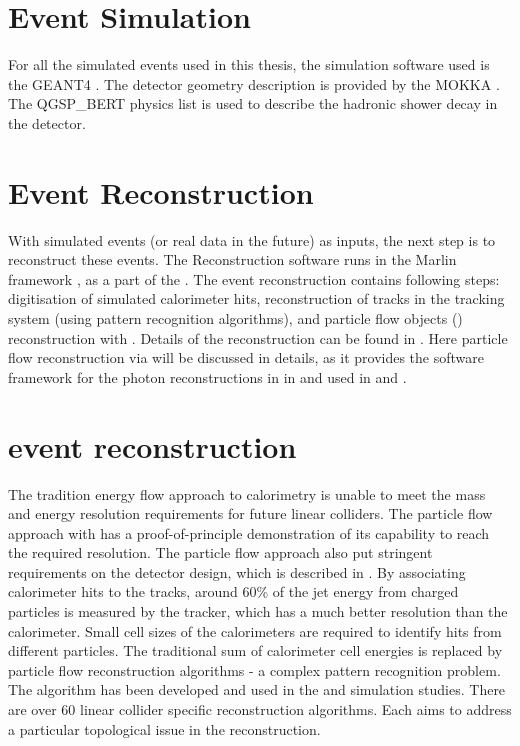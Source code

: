 \section{Event Simulation}

For all the simulated events used in this thesis, the simulation software used is the GEANT4 \cite{Agostinelli:2002hh}. The detector geometry description is provided by the MOKKA \cite{MoradeFreitas:2002kj}.  The QGSP\_BERT physics list is used to describe the hadronic shower decay in the detector.


\section{Event Reconstruction}

With simulated events (or real data in the future) as inputs, the next step is to reconstruct these events. The Reconstruction software runs in the Marlin framework \cite{Gaede:2006pj}, as a part of the \ilcsoft. The event reconstruction contains following steps: digitisation of simulated calorimeter hits, reconstruction of tracks in the tracking system (using pattern recognition algorithms), and particle flow objects (\PFOs) reconstruction with \pandora\cite{Thomson:2009rp,Marshall:2012ry}. Details of the reconstruction can be found in \cite{Brau:2007zza,Linssen:2012hp}. Here particle flow reconstruction via \pandora will be discussed in details, as it provides the software framework for the photon reconstructions in \pandora in  and used in  and .

\section{\pandora event reconstruction}
\label{sec:pandoraPandoraPFA}

The tradition energy flow approach to calorimetry is unable to meet the mass and energy resolution requirements for future linear colliders. The particle flow approach with \pandora has a proof-of-principle demonstration of its capability to reach the required resolution. The particle flow approach also put stringent requirements on the detector design, which is described in . By associating calorimeter hits to the tracks, around 60\% of the jet energy from charged particles is measured by the tracker, which has a much better resolution than the calorimeter. Small cell sizes of the calorimeters are required to identify hits from different particles. The traditional sum of calorimeter cell energies is replaced by particle flow reconstruction algorithms - a complex pattern recognition problem.  The \pandora algorithm has been developed and used in the \ILC and \CLIC simulation studies. There are over 60 linear collider specific reconstruction algorithms. Each aims to address a particular topological issue in the reconstruction.

